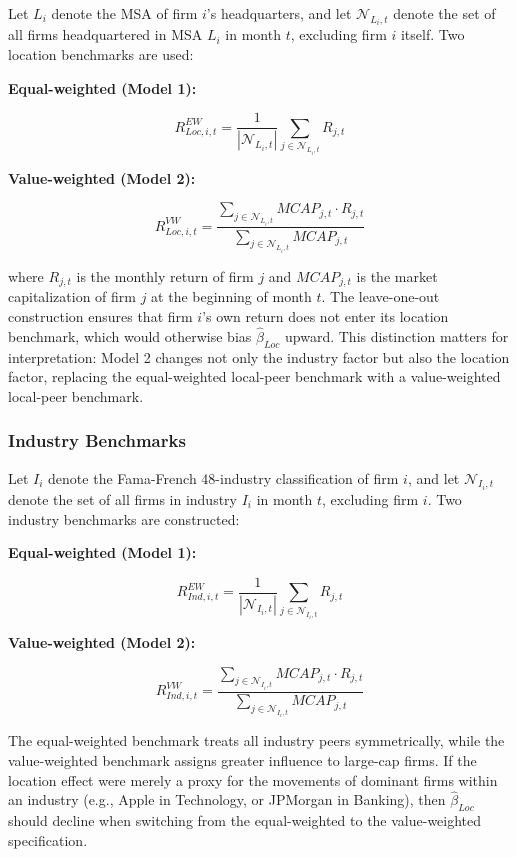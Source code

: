 \documentclass[
  12pt,
]{article}
\begin{document}
Let \(L_i\) denote the MSA of firm \(i\)'s headquarters, and let
\(\mathcal{N}_{L_i,t}\) denote the set of all firms headquartered in MSA
\(L_i\) in month \(t\), excluding firm \(i\) itself. Two location
benchmarks are used:

\textbf{Equal-weighted (Model 1):}

\[R_{Loc,i,t}^{EW} = \frac{1}{|\mathcal{N}_{L_i,t}|} \sum_{j \in \mathcal{N}_{L_i,t}} R_{j,t}\]

\textbf{Value-weighted (Model 2):}

\[R_{Loc,i,t}^{VW} = \frac{\sum_{j \in \mathcal{N}_{L_i,t}} MCAP_{j,t} \cdot R_{j,t}}{\sum_{j \in \mathcal{N}_{L_i,t}} MCAP_{j,t}}\]

\noindent where \(R_{j,t}\) is the monthly return of firm \(j\) and
\(MCAP_{j,t}\) is the market capitalization of firm \(j\) at the
beginning of month \(t\). The leave-one-out construction ensures that
firm \(i\)'s own return does not enter its location benchmark, which
would otherwise bias \(\hat{\beta}_{Loc}\) upward. This distinction
matters for interpretation: Model 2 changes not only the industry factor
but also the location factor, replacing the equal-weighted local-peer
benchmark with a value-weighted local-peer benchmark.

\subsubsection{Industry Benchmarks}\label{industry-benchmarks}

Let \(I_i\) denote the Fama-French 48-industry classification of firm
\(i\), and let \(\mathcal{N}_{I_i,t}\) denote the set of all firms in
industry \(I_i\) in month \(t\), excluding firm \(i\). Two industry
benchmarks are constructed:

\textbf{Equal-weighted (Model 1):}

\[R_{Ind,i,t}^{EW} = \frac{1}{|\mathcal{N}_{I_i,t}|}\sum_{j \in \mathcal{N}_{I_i,t}} R_{j,t}\]

\textbf{Value-weighted (Model 2):}

\[R_{Ind,i,t}^{VW} = \frac{\sum_{j \in \mathcal{N}_{I_i,t}} MCAP_{j,t} \cdot R_{j,t}}{\sum_{j \in \mathcal{N}_{I_i,t}} MCAP_{j,t}}\]

\noindent The equal-weighted benchmark treats all industry peers
symmetrically, while the value-weighted benchmark assigns greater
influence to large-cap firms. If the location effect were merely a proxy
for the movements of dominant firms within an industry (e.g., Apple in
Technology, or JPMorgan in Banking), then \(\hat{\beta}_{Loc}\) should
decline when switching from the equal-weighted to the value-weighted
specification.
\end{document}
